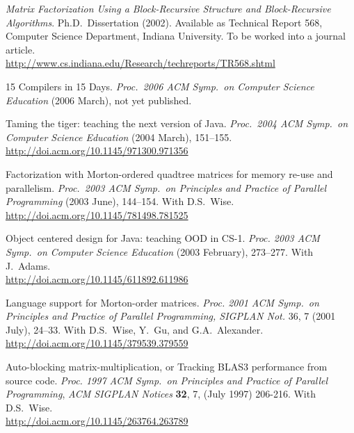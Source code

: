 \documentclass[ComputerScience]{vita}
\newcommand{\duphref}[1]{\href{#1}{#1}}
\begin{document}
\begin{vita}
\begin{Publications}
  \item \textit{Matrix Factorization Using a Block-Recursive Structure and Block-Recursive Algorithms}.  Ph.D.\ Dissertation (2002).  Available as Technical Report 568, Computer Science Department, Indiana University.  To be worked into a journal article.  \\\duphref{http://www.cs.indiana.edu/Research/techreports/TR568.shtml}

  \begin{Papers at Refereed Conferences}
	
	\item 15 Compilers in 15 Days.  \textit{Proc.\ 2006 ACM Symp.\ on Computer Science Education} (2006 March), not yet published.

	\item Taming the tiger: teaching the next version of Java.  \textit{Proc.\ 2004 ACM Symp.\ on Computer Science Education} (2004 March), 151--155.  \\\duphref{http://doi.acm.org/10.1145/971300.971356}

  \item Factorization with Morton-ordered quadtree matrices for memory re-use and parallelism. \textit{Proc.\ 2003 ACM Symp.\ on Principles and Practice of Parallel Programming} (2003 June), 144--154.  With D.S.\ Wise.  \\\duphref{http://doi.acm.org/10.1145/781498.781525}

  \item Object centered design for Java: teaching OOD in CS-1. \textit{Proc. 2003 ACM Symp.\ on Computer Science Education} (2003 February), 273--277.  With J.\ Adams.  \\\duphref{http://doi.acm.org/10.1145/611892.611986}

  \item Language support for Morton-order matrices. \textit{Proc. 2001 ACM Symp.\ on Principles and Practice of Parallel Programming, SIGPLAN Not.} 36, 7 (2001 July), 24--33.  With D.S.\ Wise, Y.\ Gu, and G.A.\ Alexander.  \\\duphref{http://doi.acm.org/10.1145/379539.379559}

  \item Auto-blocking matrix-multiplication, or Tracking BLAS3 performance from source code. \textit{Proc. 1997 ACM Symp.\ on Principles and Practice of Parallel Programming\nocorr}, \textit{ACM SIGPLAN Notices} \textbf{32}, 7, (July 1997) 206-216.  With D.S.~Wise. \\\duphref{http://doi.acm.org/10.1145/263764.263789}


\end{Papers at Refereed Conferences}
\end{Publications}
\end{vita}
\end{document}
